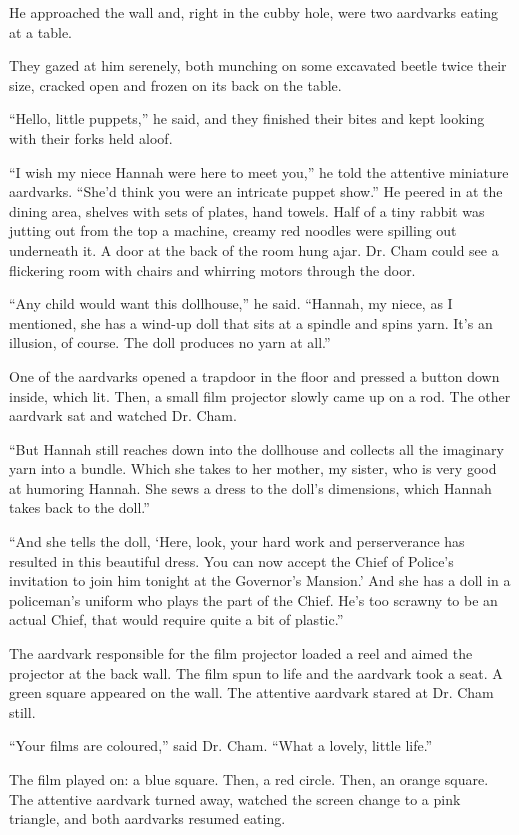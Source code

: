 \documentclass[10pt,twoside]{report}
\begin{document}
He approached the wall and, right in the cubby hole, were two
aardvarks eating at a table.

They gazed at him serenely, both munching on some excavated beetle
twice their size, cracked open and frozen on its back on the table.

``Hello, little puppets,'' he said, and they finished their bites and
kept looking with their forks held aloof.

``I wish my niece Hannah were here to meet you,'' he told the
attentive miniature aardvarks.  ``She'd think you were an intricate
puppet show.''  He peered in at the dining area, shelves with sets of
plates, hand towels.  Half of a tiny rabbit was jutting out from the
top a machine, creamy red noodles were spilling out underneath it.  A
door at the back of the room hung ajar.  Dr. Cham could see a
flickering room with chairs and whirring motors through the door.

``Any child would want this dollhouse,'' he said.  ``Hannah, my niece,
as I mentioned, she has a wind-up doll that sits at a spindle and
spins yarn.  It's an illusion, of course.  The doll produces no yarn
at all.''

One of the aardvarks opened a trapdoor in the floor and pressed a
button down inside, which lit. Then, a small film projector slowly
came up on a rod.  The other aardvark sat and watched Dr. Cham.

``But Hannah still reaches down into the dollhouse and collects all
the imaginary yarn into a bundle.  Which she takes to her mother, my
sister, who is very good at humoring Hannah. She sews a dress to the
doll's dimensions, which Hannah takes back to the doll.''

``And she tells the doll, `Here, look, your hard work and
perserverance has resulted in this beautiful dress. You can now accept
the Chief of Police's invitation to join him tonight at the Governor's
Mansion.'  And she has a doll in a policeman's uniform who plays the
part of the Chief.  He's too scrawny to be an actual Chief, that would
require quite a bit of plastic.''

The aardvark responsible for the film projector loaded a reel and
aimed the projector at the back wall.  The film spun to life and the
aardvark took a seat.  A green square appeared on the wall.  The
attentive aardvark stared at Dr. Cham still.

``Your films are coloured,'' said Dr. Cham.  ``What a lovely, little
life.''

The film played on: a blue square.  Then, a red circle.  Then, an
orange square.  The attentive aardvark turned away, watched the screen
change to a pink triangle, and both aardvarks resumed eating.
\end{document}
